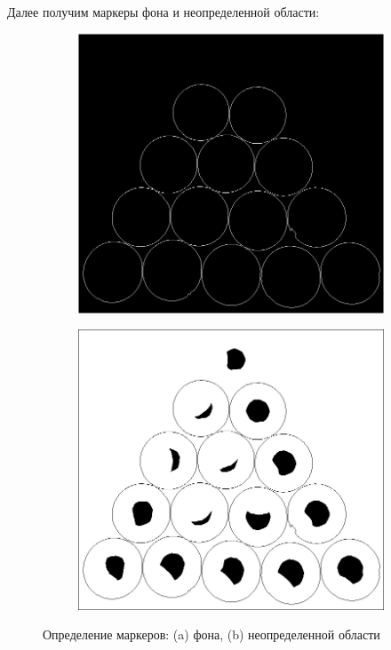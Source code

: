 Далее получим маркеры фона и неопределенной области:

\begin{figure}[ht!]
    \centering
    \begin{subfigure}{0.4\textwidth}
        \includegraphics[width=\textwidth]{images/transformed_images/3/Bg.jpg}
        \caption{}
        \label{img:bin_bg}
    \end{subfigure}
    \begin{subfigure}{0.4\textwidth}
        \includegraphics[width=\textwidth]{images/transformed_images/3/UND.jpg}
        \caption{}
        \label{img:bin_und}
    \end{subfigure}
    \caption{Определение маркеров: (a) фона, (b) неопределенной области}
    \label{img:BG}
\end{figure} 

